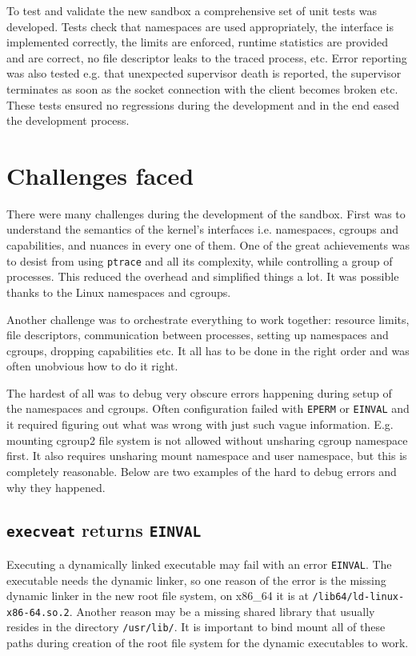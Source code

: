 \documentclass[en]{pracamgr}
\begin{document}
To test and validate the new sandbox a comprehensive set of unit tests was developed. Tests check that namespaces are used appropriately, the interface is implemented correctly, the limits are enforced, runtime statistics are provided and are correct, no file descriptor leaks to the traced process, etc. Error reporting was also tested e.g. that unexpected supervisor death is reported, the supervisor terminates as soon as the socket connection with the client becomes broken etc. These tests ensured no regressions during the development and in the end eased the development process.

\section{Challenges faced}

There were many challenges during the development of the sandbox. First was to understand the semantics of the kernel's interfaces i.e. namespaces, cgroups and capabilities, and nuances in every one of them. One of the great achievements was to desist from using \texttt{ptrace} and all its complexity, while controlling a group of processes. This reduced the overhead and simplified things a lot. It was possible thanks to the Linux namespaces and cgroups.

Another challenge was to orchestrate everything to work together: resource limits, file descriptors, communication between processes, setting up namespaces and cgroups, dropping capabilities etc. It all has to be done in the right order and was often unobvious how to do it right.

The hardest of all was to debug very obscure errors happening during setup of the namespaces and cgroups. Often configuration failed with \texttt{EPERM} or \texttt{EINVAL} and it required figuring out what was wrong with just such vague information. E.g. mounting cgroup2 file system is not allowed without unsharing cgroup namespace first. It also requires unsharing mount namespace and user namespace, but this is completely reasonable. Below are two examples of the hard to debug errors and why they happened.

\subsection{\texttt{execveat} returns \texttt{EINVAL}}

Executing a dynamically linked executable may fail with an error \texttt{EINVAL}. The executable needs the dynamic linker, so one reason of the error is the missing dynamic linker in the new root file system, on x86\_64 it is at \texttt{/lib64/ld-linux-x86-64.so.2}. Another reason may be a missing shared library that usually resides in the directory \texttt{/usr/lib/}. It is important to bind mount all of these paths during creation of the root file system for the dynamic executables to work.
\end{document}
